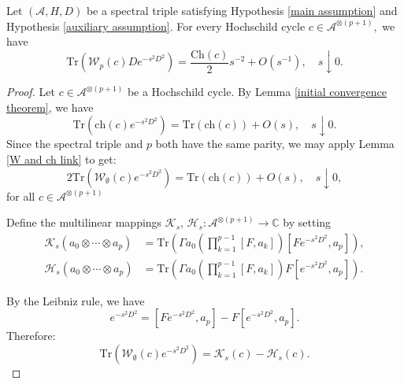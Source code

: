     \begin{thm}\label{first cycle thm} 
        Let $(\mathcal{A},H,D)$ be a spectral triple satisfying Hypothesis \ref{main assumption} and Hypothesis \ref{auxiliary assumption}. For every Hochschild cycle $c\in\mathcal{A}^{\otimes (p+1)},$ we have
        \begin{equation}\label{wp heat estimate}
            \mathrm{Tr}(\mathcal{W}_p(c)De^{-s^2D^2}) = \frac{\mathrm{Ch}(c)}{2}s^{-2}+O(s^{-1}),\quad s\downarrow0.
        \end{equation}
    \end{thm}
    \begin{proof}
        Let $c \in \mathcal{A}^{\otimes (p+1)}$ be a Hochschild cycle.
        By Lemma \ref{initial convergence theorem}, we have
        \begin{equation*}
            \mathrm{Tr}(\mathrm{ch}(c)e^{-s^2D^2}) = \mathrm{Tr}(\mathrm{ch}(c))+O(s),\quad s\downarrow0.
        \end{equation*}
        Since the spectral triple and $p$ both have the same parity, we may apply Lemma \ref{W and ch link} to get:
        \begin{equation}\label{restated initial convergence}
            2\mathrm{Tr}(\mathcal{W}_{\emptyset}(c)e^{-s^2D^2}) = \mathrm{Tr}(\mathrm{ch}(c))+O(s),\quad s\downarrow0,
        \end{equation}
        for all $c \in \mathcal{A}^{\otimes (p+1)}$

        Define the multilinear mappings $\mathcal{K}_s,\,\mathcal{H}_s:\mathcal{A}^{\otimes (p+1)}\to\mathbb{C}$ by setting
        \begin{align*}
            \mathcal{K}_s(a_0\otimes\cdots\otimes a_p) &= \mathrm{Tr}(\Gamma a_0\left(\prod_{k=1}^{p-1}[F,a_k]\right)[Fe^{-s^2D^2},a_p]),\\
            \mathcal{H}_s(a_0\otimes\cdots\otimes a_p) &= \mathrm{Tr}(\Gamma a_0\left(\prod_{k=1}^{p-1}[F,a_k]\right)F[e^{-s^2D^2},a_p]).
        \end{align*}

        By the Leibniz rule, we have
        \begin{equation*}
            [F,a_p]e^{-s^2D^2} = [Fe^{-s^2D^2},a_p]-F[e^{-s^2D^2},a_p].
        \end{equation*}
        Therefore:
        \begin{equation}\label{k minus h}
            \mathrm{Tr}(\mathcal{W}_{\emptyset}(c)e^{-s^2D^2}) = \mathcal{K}_s(c)-\mathcal{H}_s(c).
        \end{equation}


\end{proof}
